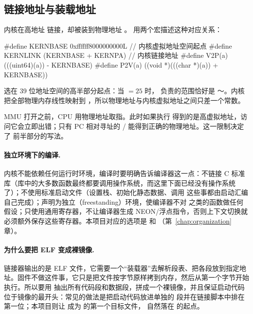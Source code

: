 \subsection{链接地址与装载地址}

内核在高地址  链接，却被装到物理地址 。 用两个宏描述这种对应关系：

\begin{ccode}
#define KERNBASE  0xffffff8000000000L     // 内核虚拟地址空间起点
#define KERNLINK  (KERNBASE + KERNPA)     // 内核链接地址
#define V2P(a) (((uint64)(a)) - KERNBASE)
#define P2V(a) ((void *)(((char *)(a)) + KERNBASE))
\end{ccode}

 选在 39 位地址空间的高半部分起点：当 $=25$ 时， 负责的范围恰好是 ～。内核把全部物理内存线性映射到 ，所以物理地址与内核虚拟地址之间只差一个常数。

MMU 打开之前，CPU 用物理地址取指。此时如果执行  得到的是高虚拟地址，访问它会立即出错；只有 PC 相对寻址的 / 能得到正确的物理地址。这一限制决定了  前半部分的写法。

\paragraph{独立环境下的编译.} 内核不能依赖任何运行时环境，编译时要明确告诉编译器这一点：不链接 C 标准库（库中的大多数函数最终都要调用操作系统，而这里下面已经没有操作系统了）；不使用标准启动文件（设置栈、初始化静态数据、调用  这些事都由启动汇编自己完成）；声明为独立（freestanding）环境，使编译器不对  之类的函数做任何假设；只使用通用寄存器，不让编译器生成 NEON/浮点指令，否则上下文切换就必须额外保存这些寄存器。本项目对应的选项是  和 （第~\ref{chap:organization} 章）。

\paragraph{为什么要把 ELF 变成裸镜像.} 链接器输出的是 ELF 文件，它需要一个“装载器”去解析段表、把各段放到指定地址。固件不做这件事，它只是把文件按字节原样拷到内存，然后从第一个字节开始执行。所以要用  抽出所有代码段和数据段，拼成一个裸镜像，并且保证启动代码位于镜像的最开头：常见的做法是把启动代码放进单独的  段并在链接脚本中排在第一位；本项目则让  成为  的第一个目标文件， 自然落在  的起点。

